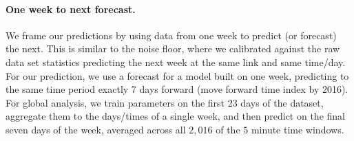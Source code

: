 \documentclass[sigconf, review]{acmart}
\newcommand{\NFG}{\tau_{\textsf{global}}}
\newcommand{\hamid}[1]{{\color{blue}\textbf{HAMID:}\ #1}}
\newcommand{\jeff}[1]{{\color{red}\textbf{JEFF:}\ #1}}
\begin{document}



\paragraph{One week to next forecast.}
We frame our predictions by using data from one week to predict (or forecast) the next.  This is similar to the noise floor, where we calibrated against the raw data set statistics predicting the next week at the same link and same time/day.  
For our prediction, we use a forecast for a model built on one week, predicting to the same time period exactly 7 days forward (move forward time index by 2016).  
For global analysis, we train parameters on the first 23 days of the dataset, aggregate them to the days/times of a single week, and then predict on the final seven days of the week, averaged across all $2{,}016$ of the $5$ minute time windows.  
\end{document}
